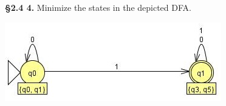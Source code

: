 \documentclass[12pt,letter]{article}
\begin{document}


\textbf{\S 2.4 4.} Minimize the states in the depicted DFA.

\begin{center}
	\includegraphics{"images/Lab 2 - 4"}
\end{center}


%
%
%
%
%
%
\end{document}
